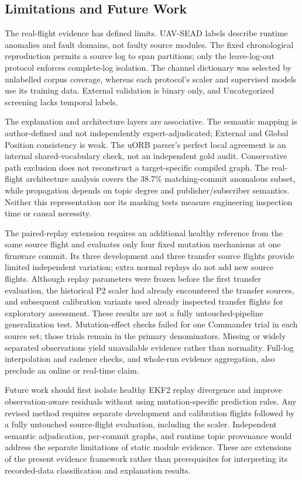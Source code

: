 \subsection{Limitations and Future Work}

The real-flight evidence has defined limits. UAV-SEAD labels describe runtime anomalies and fault domains, not faulty source modules. The fixed chronological reproduction permits a source log to span partitions; only the leave-log-out protocol enforces complete-log isolation. The channel dictionary was selected by unlabelled corpus coverage, whereas each protocol's scaler and supervised models use its training data. External validation is binary only, and Uncategorized screening lacks temporal labels.

The explanation and architecture layers are associative. The semantic mapping is author-defined and not independently expert-adjudicated; External and Global Position consistency is weak. The uORB parser's perfect local agreement is an internal shared-vocabulary check, not an independent gold audit. Conservative path exclusion does not reconstruct a target-specific compiled graph. The real-flight architecture analysis covers the 38.7\% matching-commit anomalous subset, while propagation depends on topic degree and publisher/subscriber semantics. Neither this representation nor its masking tests measure engineering inspection time or causal necessity.

The paired-replay extension requires an additional healthy reference from the same source flight and evaluates only four fixed mutation mechanisms at one firmware commit. Its three development and three transfer source flights provide limited independent variation; extra normal replays do not add new source flights. Although replay parameters were frozen before the first transfer evaluation, the historical P2 scaler had already encountered the transfer sources, and subsequent calibration variants used already inspected transfer flights for exploratory assessment. These results are not a fully untouched-pipeline generalization test. Mutation-effect checks failed for one Commander trial in each source set; those trials remain in the primary denominators. Missing or widely separated observations yield unavailable evidence rather than normality. Full-log interpolation and cadence checks, and whole-run evidence aggregation, also preclude an online or real-time claim.

Future work should first isolate healthy EKF2 replay divergence and improve observation-aware residuals without using mutation-specific prediction rules. Any revised method requires separate development and calibration flights followed by a fully untouched source-flight evaluation, including the scaler. Independent semantic adjudication, per-commit graphs, and runtime topic provenance would address the separate limitations of static module evidence. These are extensions of the present evidence framework rather than prerequisites for interpreting its recorded-data classification and explanation results.
